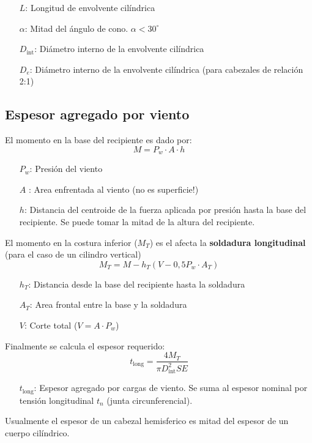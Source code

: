 \documentclass[twocolumn]{article}
\newcommand{\Dint}{D_\text{int}}
\begin{document}
\begin{itemize}
	\item[$L$:] Longitud de envolvente cilíndrica 
	\item[$\alpha$:] Mitad del ángulo de cono. $\alpha < 30^\circ$
	\item[$\Dint$:] Diámetro interno de la envolvente cilíndrica
	\item[$D_e$:] Diámetro interno de la envolvente cilíndrica (para cabezales de relación 2:1)
\end{itemize}

\subsection{Espesor agregado por viento}

El momento en la base del recipiente es dado por:
\[
M = P_w \cdot A \cdot h 
\]
\begin{itemize}
	\item[$P_w$:] Presión del viento
	\item[$A$]: Area enfrentada al viento (no es superficie!)
	\item[$h$:] Distancia del centroide de la fuerza aplicada por presión hasta la base del recipiente. Se puede tomar la mitad de la altura del recipiente.
\end{itemize}

El momento en la costura inferior ($M_T$) es el afecta la \textbf{soldadura longitudinal} (para el caso de un cilindro vertical)
\[
M_T = M - h_T(V - 0,5P_w \cdot A_T)
\]
\begin{itemize}
	\item[$h_T$:] Distancia desde la base del recipiente hasta la soldadura
	\item[$A_T$:] Area frontal entre la base y la soldadura
	\item[$V$:] Corte total ($V=A\cdot P_w$)
\end{itemize}

Finalmente se calcula el espesor requerido:
\[
t_{\text{long}} = \frac{4 M_T}{\pi \Dint^2 S E}
\]
\begin{itemize}
	\item[$t_{\text{long}}$:] Espesor agregado por cargas de viento. Se suma al espesor nominal por tensión longitudinal $t_n$ (junta circunferencial).
\end{itemize}


Usualmente el espesor de un cabezal hemisferico es mitad del espesor de un cuerpo cilíndrico.
\end{document}
